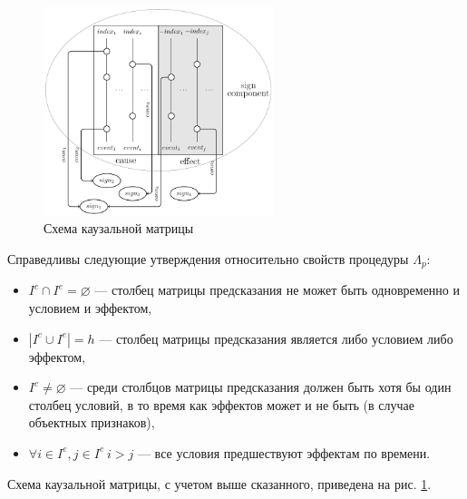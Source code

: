 \documentclass[12pt]{scrartcl}
\begin{document}
	\begin{figure}
		\centering
		\includegraphics[width=0.6\textwidth]{causnet/caus_matr}
		\caption{Схема каузальной матрицы}	
		\label{fig:caus_matr}	
	\end{figure}
	
	Справедливы следующие утверждения относительно свойств процедуры $\Lambda_p$:
	\begin{itemize}
		\item $I^c\cap I^e=\varnothing$ --- столбец матрицы предсказания не может быть одновременно и условием и эффектом,
		\item $|I^c\cup I^e|=h$ --- столбец матрицы предсказания является либо условием либо эффектом,
		\item $I^c\not = \varnothing$ --- среди столбцов матрицы предсказания должен быть хотя бы один столбец условий, в то время как эффектов может и не быть (в случае объектных признаков),
		\item $\forall i\in I^e, j\in I^c\ i>j$ --- все условия предшествуют эффектам по времени.
	\end{itemize}
	
	Схема каузальной матрицы, с учетом выше сказанного, приведена на рис. \ref{fig:caus_matr}.
	
\end{document}
